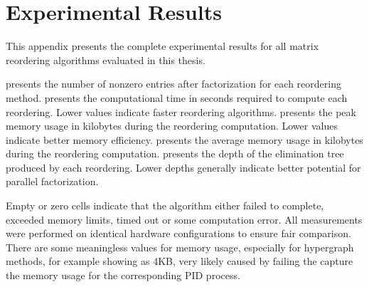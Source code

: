 \chapter{Experimental Results}
\label{app:experimental_results}

This appendix presents the complete experimental results for all matrix reordering algorithms evaluated in this thesis.

 presents the number of nonzero entries after factorization for each reordering method.  presents the computational time in seconds required to compute each reordering.
Lower values indicate faster reordering algorithms.  presents the peak memory usage in kilobytes during the reordering computation.
Lower values indicate better memory efficiency.  presents the average memory usage in kilobytes during the reordering computation.  presents the depth of the elimination tree produced by each reordering.
Lower depths generally indicate better potential for parallel factorization.

Empty or zero cells indicate that the algorithm either failed to complete, exceeded memory limits, timed out or some computation error. 
All measurements were performed on identical hardware configurations to ensure fair comparison. There are some meaningless values for memory usage, especially for hypergraph methods, for example showing as 4KB, very likely caused by failing the capture the memory usage for the corresponding PID process.

